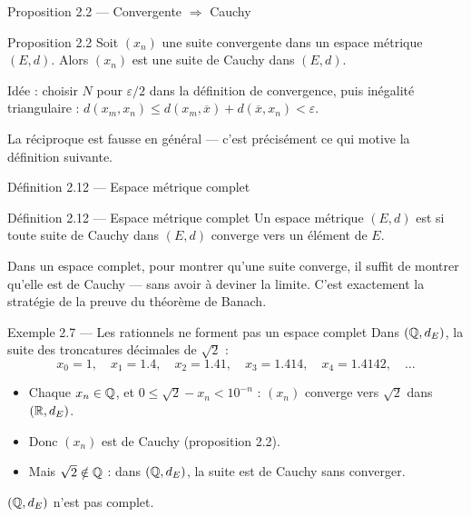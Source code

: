 \begin{frame}{Proposition 2.2 --- Convergente $\Rightarrow$ Cauchy}
  \begin{Enonce}{Proposition 2.2}
    Soit $(x_n)$ une suite convergente dans un espace métrique $(E,d)$.
    Alors $(x_n)$ est une suite de Cauchy dans $(E,d)$.
  \end{Enonce}
  \begin{AuTableau}
    \small Idée : choisir $N$ pour $\varepsilon/2$ dans la définition de
    convergence, puis inégalité triangulaire :
    $d(x_m,x_n)\leq d(x_m,\overline{x})+d(\overline{x},x_n)<\varepsilon$.
  \end{AuTableau}
  \vspace{4pt}
  \small La réciproque est fausse en général --- c'est
  précisément ce qui motive la définition suivante.
\end{frame}

\begin{frame}{Définition 2.12 --- Espace métrique complet}
  \begin{Enonce}{Définition 2.12 --- Espace métrique complet}
    Un espace métrique $(E,d)$ est  si toute suite de
    Cauchy dans $(E,d)$ converge vers un élément de $E$.
  \end{Enonce}
  \vspace{6pt}
  \small Dans un espace complet, pour montrer qu'une suite converge, il
  suffit de montrer qu'elle est de Cauchy --- sans avoir à
  deviner la limite. C'est exactement la stratégie de la preuve du
  théorème de Banach.
\end{frame}

\begin{frame}{Exemple 2.7 --- Les rationnels ne forment pas un espace complet}
  \small Dans $(\operatorname{\mathbb{Q}},d_E)$, la suite des troncatures décimales de $\sqrt2$ :
  \[
    x_0=1,\quad x_1=\num{1.4},\quad x_2=\num{1.41},\quad
    x_3=\num{1.414},\quad x_4=\num{1.4142},\quad\ldots
  \]
  \begin{itemize}
    \item Chaque $x_n\in\operatorname{\mathbb{Q}}$, et $0\leq\sqrt2-x_n<10^{-n}$ : $(x_n)$
      converge vers $\sqrt2$ dans $(\operatorname{\mathbb{R}},d_E)$.
    \item Donc $(x_n)$ est de Cauchy (proposition 2.2).
    \item Mais $\sqrt2\notin\operatorname{\mathbb{Q}}$ : dans $(\operatorname{\mathbb{Q}},d_E)$, la suite est de Cauchy
      sans converger.
  \end{itemize}
  \vspace{4pt}
  $(\operatorname{\mathbb{Q}},d_E)$ n'est pas complet.
\end{frame}

